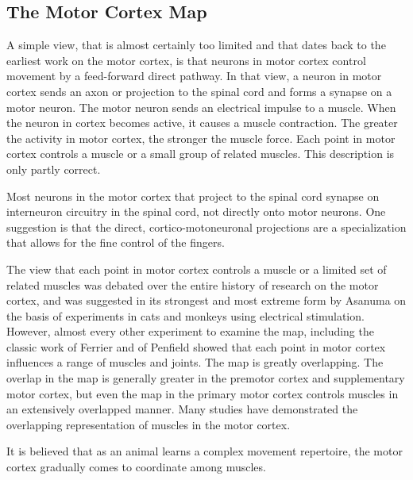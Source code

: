 \documentclass[]{book}
\begin{document}
\hypertarget{the-motor-cortex-map}{%
\subsection{The Motor Cortex Map}\label{the-motor-cortex-map}}

A simple view, that is almost certainly too limited and that dates back to the earliest work on the motor cortex, is that neurons in motor cortex control movement by a feed-forward direct pathway. In that view, a neuron in motor cortex sends an axon or projection to the spinal cord and forms a synapse on a motor neuron. The motor neuron sends an electrical impulse to a muscle. When the neuron in cortex becomes active, it causes a muscle contraction. The greater the activity in motor cortex, the stronger the muscle force. Each point in motor cortex controls a muscle or a small group of related muscles. This description is only partly correct.

Most neurons in the motor cortex that project to the spinal cord synapse on interneuron circuitry in the spinal cord, not directly onto motor neurons. One suggestion is that the direct, cortico-motoneuronal projections are a specialization that allows for the fine control of the fingers.

The view that each point in motor cortex controls a muscle or a limited set of related muscles was debated over the entire history of research on the motor cortex, and was suggested in its strongest and most extreme form by Asanuma on the basis of experiments in cats and monkeys using electrical stimulation. However, almost every other experiment to examine the map, including the classic work of Ferrier and of Penfield showed that each point in motor cortex influences a range of muscles and joints. The map is greatly overlapping. The overlap in the map is generally greater in the premotor cortex and supplementary motor cortex, but even the map in the primary motor cortex controls muscles in an extensively overlapped manner. Many studies have demonstrated the overlapping representation of muscles in the motor cortex.

It is believed that as an animal learns a complex movement repertoire, the motor cortex gradually comes to coordinate among muscles.
\end{document}
